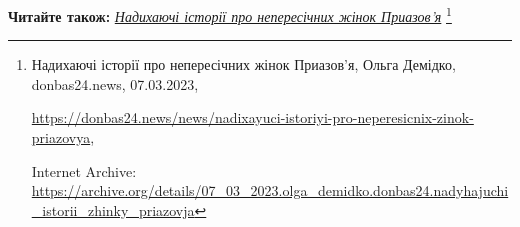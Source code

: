  
 
 
 
 

\textbf{Читайте також:} \href{https://archive.org/details/07_03_2023.olga_demidko.donbas24.nadyhajuchi_istorii_zhinky_priazovja}{\emph{Надихаючі історії про непересічних жінок Приазов'я}}%
\footnote{Надихаючі історії про непересічних жінок Приазов'я, Ольга Демідко, donbas24.news, 07.03.2023, \par%
\url{https://donbas24.news/news/nadixayuci-istoriyi-pro-neperesicnix-zinok-priazovya}, \par%
Internet Archive: \url{https://archive.org/details/07_03_2023.olga_demidko.donbas24.nadyhajuchi_istorii_zhinky_priazovja}%
}
